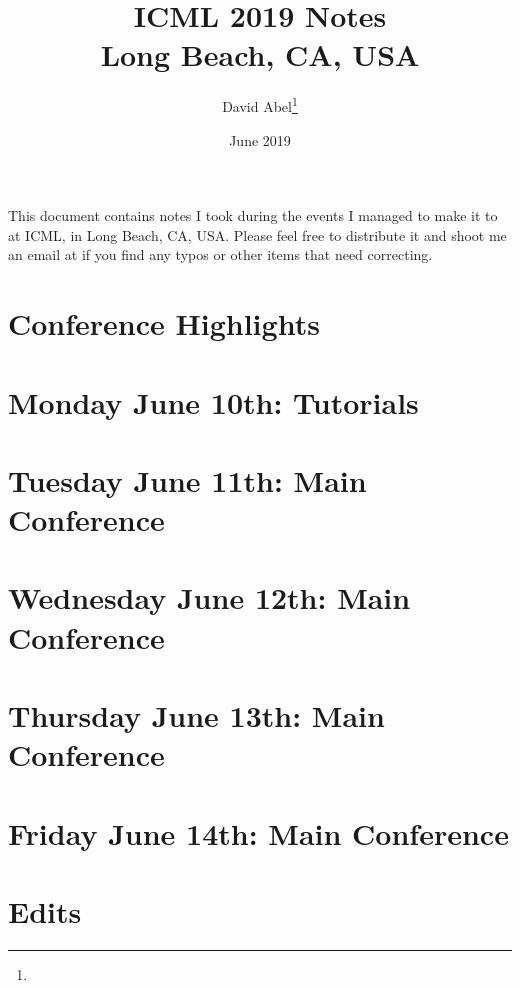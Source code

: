 \documentclass[11pt]{article}
\title{ICML 2019 Notes \\ \Large{Long Beach, CA, USA}}
\author{David Abel\footnote{\durl{http://david-abel.github.io}} \\ \durl{david_abel@brown.edu}}
\date{June 2019}
\begin{document}
\maketitle
\tableofcontents
\newpage


This document contains notes I took during the events I managed to make it to at ICML, in Long Beach, CA, USA. Please feel free to distribute it and shoot me an email at  if you find any typos or other items that need correcting. 


\section{Conference Highlights}

\newpage
\section{Monday June 10th: Tutorials}




\newpage
\section{Tuesday June 11th: Main Conference}




\newpage
\section{Wednesday June 12th: Main Conference}




\newpage
\section{Thursday June 13th: Main Conference}




\newpage
\section{Friday June 14th: Main Conference}




\section*{Edits}




\newpage


\end{document}
